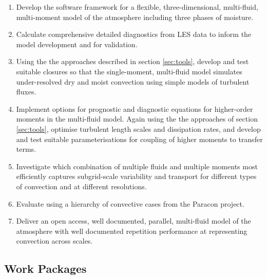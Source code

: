 \documentclass[11pt,a4paper]{article}
\begin{document}
\begin{enumerate}
\item\label{it:model} Develop the software framework for a flexible, three-dimensional, multi-fluid, multi-moment model of the atmosphere including three phases of moisture. %

\item\label{it:budgets} Calculate comprehensive detailed diagnostics from LES data to inform the model development and for validation.


\item Using the the approaches described in section \ref{sec:tools}, develop and test suitable closures so that the single-moment, multi-fluid model simulates under-resolved dry and moist convection using simple models of turbulent fluxes.

\item Implement options for prognostic and diagnostic equations for higher-order moments in the multi-fluid model. Again using the the approaches of section \ref{sec:tools}, optimise turbulent length scales and dissipation rates, and develop and test suitable parameterisations for coupling of higher moments to transfer terms.


\item Investigate which combination of multiple fluids and multiple moments most efficiently captures subgrid-scale
variability and transport for different types of convection and at different resolutions.

\item Evaluate using a hierarchy of convective cases from the Paracon project.

\item Deliver an open access, well documented, parallel, multi-fluid model of the atmosphere with well documented {\color{red} repetition} performance at representing convection across scales.
\end{enumerate}

\subsection{Work Packages}
\label{sec:WPs}
\end{document}

